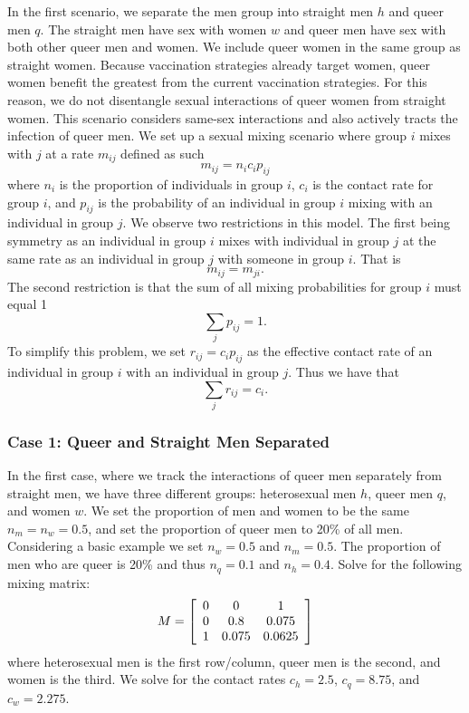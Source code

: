 \documentclass[12pt]{article}
\begin{document}
In the first scenario, we separate the men group into straight men $h$ and queer men $q$. The straight men have sex with women $w$ and queer men have sex with both other queer men and women.  We include queer women in the same group as straight women. Because vaccination strategies already target women, queer women benefit the greatest from the current vaccination strategies.  For this reason, we do not disentangle sexual interactions of queer women from straight women.  This scenario considers same-sex interactions and also actively tracts the infection of queer men.  We set up a sexual mixing scenario where group $i$ mixes with $j$ at a rate $m_{ij}$ defined as such
\begin{equation}
m_{ij} = n_ic_i p_{ij}
\end{equation}
where $n_i$ is the proportion of individuals in group $i$, $c_i$ is the contact rate for group $i$, and $p_{ij}$ is the probability of an individual in group $i$ mixing with an individual in group $j$.  We observe two restrictions in this model.  The first being symmetry as an individual in group $i$ mixes with individual in group $j$ at the same rate as an individual in group $j$ with someone in group $i$. That is
\begin{equation}
m_{ij}=m_{ji}.
\end{equation}
The second restriction is that the sum of all mixing probabilities for group $i$ must equal 1
\begin{equation}
\sum_j p_{ij} = 1.
\end{equation}
To simplify this problem, we set $r_{ij}=c_ip_{ij}$ as the effective contact rate of an individual in group $i$ with an individual in group $j$.  Thus we have that 
\begin{equation}
\sum_j r_{ij} = c_i.
\end{equation}

\subsubsection{Case 1: Queer and Straight Men Separated}

In the first case, where we track the interactions of queer men separately from straight men, we have three different groups: heterosexual men $h$, queer men $q$, and women $w$.  We set the proportion of men and women to be the same $n_m=n_w=0.5$, and set the proportion of queer men to 20\% of all men.  Considering a basic example we set $n_w=0.5$ and $n_m=0.5$.  The proportion of men who are queer is 20\% and thus $n_q=0.1$ and $n_h=0.4$.  Solve for the following mixing matrix:
\begin{equation}
M = \left[\begin{array}{c c c}
0 & 0 & 1 \\
0 & 0.8 & 0.075 \\
1 & 0.075 & 0.0625 
\end{array}\right]
\end{equation}
where heterosexual men is the first row/column, queer men is the second, and women is the third.  We solve for the contact rates $c_h=2.5$, $c_q=8.75$, and $c_w=2.275$.  
\end{document}

